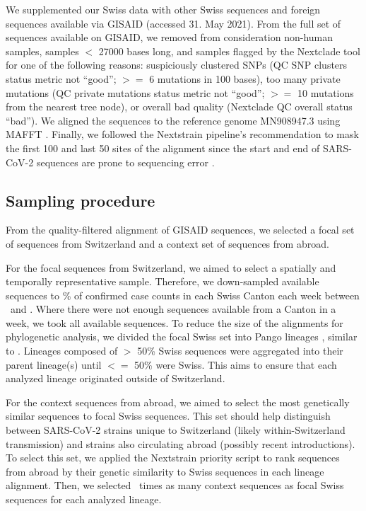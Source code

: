 \documentclass[9pt,twoside,lineno]{pnas-new} %
\newcommand{\maxsamplingpercent}{\maxsamplingfraction*100}
\begin{document}
We supplemented our Swiss data with other Swiss sequences and foreign sequences available via GISAID (accessed 31. May 2021). From the full set of sequences available on GISAID, we removed from consideration non-human samples, samples $<$ 27000 bases long, and samples flagged by the Nextclade tool \cite{Aksamentov} for one of the following reasons: suspiciously clustered SNPs (QC SNP clusters status metric not ``good''; $>=$ 6 mutations in 100 bases), too many private mutations (QC private mutations status metric not ``good''; $>=$ 10 mutations from the nearest tree node), or overall bad quality (Nextclade QC overall status ``bad''). We aligned the sequences to the reference genome MN908947.3 using MAFFT \cite{katoh_mafft:_2002}. Finally, we followed the Nextstrain pipeline's recommendation to mask the first 100 and last 50 sites of the alignment \cite{Nextstraina} since the start and end of SARS-CoV-2 sequences are prone to sequencing error \cite{DeMaio2020}.

\subsection*{Sampling procedure}

From the quality-filtered alignment of GISAID sequences, we selected a focal set of sequences from Switzerland and a context set of sequences from abroad. 

For the focal sequences from Switzerland, we aimed to select a spatially and temporally representative sample. Therefore, we down-sampled available sequences to \fpeval{\maxsamplingpercent}\% of confirmed case counts in each Swiss Canton each week between \mindate\ and \maxdate. Where there were not enough sequences available from a Canton in a week, we took all available sequences. To reduce the size of the alignments for phylogenetic analysis, we divided the focal Swiss set into Pango lineages \cite{Rambaut}, similar to \cite{DuPlessis2021}. Lineages composed of $>$ 50\% Swiss sequences were aggregated into their parent lineage(s) until $<=$ 50\% were Swiss. This aims to ensure that each analyzed lineage originated outside of Switzerland.

For the context sequences from abroad, we aimed to select the most genetically similar sequences to focal Swiss sequences. This set should help distinguish between SARS-CoV-2 strains unique to Switzerland (likely within-Switzerland transmission) and strains also circulating abroad (possibly recent introductions). To select this set, we applied the Nextstrain priority script \cite{Nextstrain} to rank sequences from abroad by their genetic similarity to Swiss sequences in each lineage alignment. Then, we selected \similaritycontextscalefactor\ times as many  context sequences as focal Swiss sequences for each analyzed lineage. 
\end{document}

